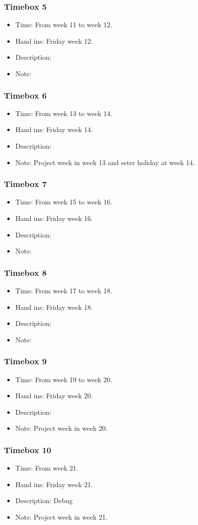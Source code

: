 \documentclass[10pt,a4paper]{article}
\begin{document}
\subsubsection{Timebox 5}
\begin{itemize}
\item Time: From week 11 to week 12.
\item Hand ins: Friday week 12.
\item Description:
\item Note:
\end{itemize}

\subsubsection{Timebox 6}
\begin{itemize}
\item Time: From week 13 to week 14.
\item Hand ins: Friday week 14.
\item Description:
\item Note: Project week in week 13 and ester holiday at week 14.
\end{itemize}

\subsubsection{Timebox 7}
\begin{itemize}
\item Time: From week 15 to week 16.
\item Hand ins: Friday week 16.
\item Description:
\item Note:
\end{itemize}

\subsubsection{Timebox 8}
\begin{itemize}
\item Time: From week 17 to week 18.
\item Hand ins: Friday week 18.
\item Description:
\item Note:
\end{itemize}

\subsubsection{Timebox 9}
\begin{itemize}
\item Time: From week 19 to week 20.
\item Hand ins: Friday week 20.
\item Description:
\item Note: Project week in week 20.
\end{itemize}

\subsubsection{Timebox 10}
\begin{itemize}
\item Time: From week 21.
\item Hand ins: Friday week 21.
\item Description: Debug
\item Note: Project week in week 21.
\end{itemize}
\end{document}
